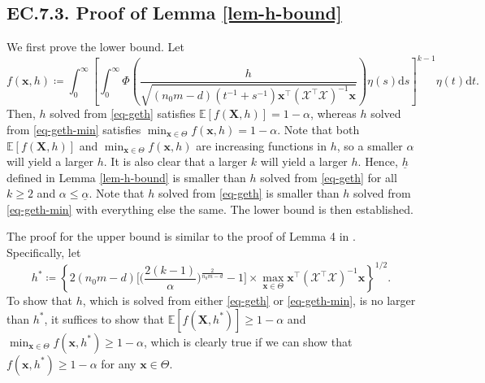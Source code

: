 \documentclass[ijoc,nonblindrev]{informs3}
\def\E{\mathbb{E}}
\def\ud{\mathrm{d}}
\def\bx{{\bm x}}
\def\bX{{\bm X}}
\def\cX{{\mathcal X}}
\begin{document}
\vspace{5pt}
\hypertarget{EC.7.3}{
\subsection*{EC.7.3. \hspace{5pt} Proof of Lemma \ref{lem-h-bound}}
}

We first prove the lower bound.
Let
$$f(\bx,h) \coloneqq \int_0^\infty \left[\int_0^\infty \Phi \left( \frac{h}{\sqrt{(n_0m-d) (t^{-1}+s^{-1})\bx^\intercal (\cX^\intercal \cX)^{-1} \bx}} \right) \eta(s)\ud s \right]^{k-1} \eta(t) \ud t.$$
Then, $h$ solved from \eqref{eq-geth} satisfies $\E[f(\bX,h)]=1-\alpha$, whereas $h$ solved from \eqref{eq-geth-min} satisfies $\min_{\bx\in\Theta} f(\bx,h)=1-\alpha$.
Note that both $\E[f(\bX,h)]$ and $\min_{\bx\in\Theta} f(\bx,h)$ are increasing functions in $h$, so
a smaller $\alpha$ will yield a larger $h$.
It is also clear that a larger $k$ will yield a larger $h$.
Hence, $\underline{h}$ defined in Lemma \ref{lem-h-bound} is smaller than $h$ solved from \eqref{eq-geth} for all $k\geq 2$ and $\alpha\leq \underline{\alpha}$.
Note that $h$ solved from \eqref{eq-geth} is smaller than $h$ solved from \eqref{eq-geth-min} with everything else the same.
The lower bound is then established.

The proof for the upper bound is similar to the proof of Lemma 4 in \cite{zhong2020_ec}.
Specifically, let
\[
h^* \coloneqq \left\{2(n_0m-d)\Big[\big(\frac{2(k-1)}{\alpha}\big)^{\frac{2}{n_0m-d}}-1\Big] \times \max_{\bx\in\Theta} \bx^\intercal (\cX^\intercal \cX)^{-1} \bx \right\}^{1/2}.
\]
To show that $h$, which is  solved from either \eqref{eq-geth} or \eqref{eq-geth-min}, is no larger than $h^*$, it suffices to show that
$\E[f(\bX,h^*)]\geq1-\alpha$ and $\min_{\bx\in\Theta} f(\bx,h^*)\geq1-\alpha$, which is clearly true if we can show that $f(\bx,h^*)\geq1-\alpha$ for any $\bx\in\Theta$.
\end{document}
